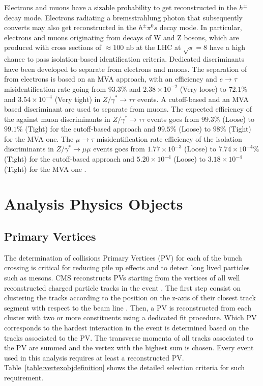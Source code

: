Electrons and muons have a sizable probability to get reconstructed in the \ensuremath{h^{\pm}} decay mode. Electrons radiating a bremsstrahlung photon that subsequently converts may also get reconstructed in the \ensuremath{h^{\pm}\pi^{0}s} decay mode. In particular, electrons and muons originating from decays of W and Z bosons, which are produced with cross sections of \ensuremath{\approx100} nb at the LHC at \ensuremath{\sqrt{s} = 8} \tev have a high chance to pass isolation-based \hadtau identification criteria. Dedicated discriminants have been developed to separate \hadtau from electrons and muons. The separation of \hadtau from electrons is based on an MVA approach, with an efficiency and \ensuremath{e\to \tau} misidentification rate going from \ensuremath{93.3\%} and \ensuremath{2.38 \times 10^{−2}} (Very loose) to \ensuremath{72.1\%} and \ensuremath{3.54 \times 10^{−4}} (Very tight) in \ensuremath{Z/\gamma^{*} \longrightarrow \tau\tau} events.
A cutoff-based and an MVA based discriminant are used to separate \hadtau from muons. The expected efficiency of the \hadtau against muon discriminants in \ensuremath{Z/\gamma^{*} \longrightarrow \tau\tau} events goes from \ensuremath{99.3\%} (Loose) to \ensuremath{99.1}\% (Tight) for the cutoff-based approach and \ensuremath{99.5\%} (Loose) to \ensuremath{98\%} (Tight) for the MVA one. The \ensuremath{\mu \to \tau} misidentification rate efficiency of the \hadtau isolation discriminants in \ensuremath{Z/\gamma^{*} \longrightarrow \mu\mu} events goes from \ensuremath{1.77 \times 10^{−3}} (Loose) to \ensuremath{7.74 \times 10^{−4}}\% (Tight) for the cutoff-based approach and \ensuremath{5.20 \times 10^{−4}} (Loose) to \ensuremath{3.18 \times 10^{−4}} (Tight) for the MVA one \cite{Khachatryan:2015dfa}.

\section {Analysis Physics Objects}

\subsection{Primary Vertices}
\label{subsec::objsel_vertex}

The determination of collisions Primary Vertices (PV) for each of the bunch crossing is critical for reducing pile up effects and to detect long lived particles such as mesons. CMS reconstructs PVs starting from the vertices of all well reconstructed charged particle tracks in the event \cite{CMS-PAS-TRK-10-005}. The first step consist on clustering the tracks according to the position on the z-axis of their closest track segment with respect to the beam line \cite{CMS-IN-2011-014}. Then, a PV is reconstructed from each cluster with two or more constituents using a dedicated fit procedure. Which PV corresponds to the hardest interaction in the event is determined based on the tracks associated to the PV. The transverse momenta of all tracks associated to the PV are summed and the vertex with the highest sum is chosen. Every event used in this analysis requires at least a reconstructed PV. Table~\ref{table:vertexobjdefinition} shows the detailed selection criteria for such requirement.

